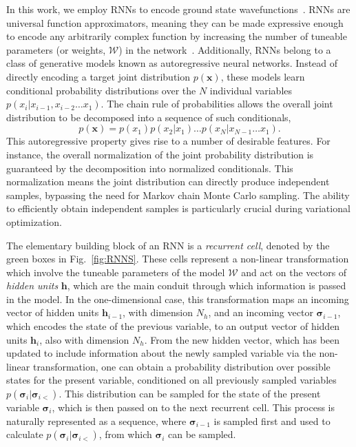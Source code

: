 \documentclass[twocolumn,
                showpacs,
                nofootinbib,
                nobibnotes,
                aps,
                superscriptaddress,
                amssymb,
                amsmath,
                floatfix,
                reprint,
                prx, 
                notitlepage,
                showkeys,
                10pt,
		]{revtex4-2}
\begin{document}
In this work, we employ RNNs to encode ground state wavefunctions~\cite{hibat2020recurrent}.
RNNs are universal function approximators, meaning they can be made expressive enough to encode any arbitrarily complex function by increasing the number of tuneable parameters (or weights, $\mathcal{W}$) in the network~\cite{schafer2006recurrent}. 
Additionally, RNNs belong to a class of generative models known as autoregressive neural networks.
Instead of directly encoding a target joint distribution $p(\mathbf{x})$, these models learn conditional probability distributions over the $N$ individual variables~$p(x_i\vert x_{i-1},x_{i-2}\dots x_{1})$. The chain rule of probabilities allows the overall joint distribution to be decomposed into a sequence of such conditionals, 
\begin{equation}
    p(\mathbf{x}) = p(x_1)p(x_2\vert x_1)\dots p(x_N\vert x_{N-1}\dots x_1).
\label{ProbChainRule}
\end{equation}
This autoregressive property gives rise to a number of desirable features. For instance, the overall normalization of the joint probability distribution is guaranteed by the decomposition into normalized conditionals. 
This normalization means the joint distribution can directly produce independent samples, bypassing the need for Markov chain Monte Carlo sampling. The ability to efficiently obtain independent samples is particularly crucial during variational optimization. 



The elementary building block of an RNN is a \emph{recurrent cell}, denoted by the green boxes in Fig.~\ref{fig:RNNS}. 
These cells represent a non-linear transformation which involve the tuneable parameters of the model $\mathcal{W}$ and act on the vectors of \emph{hidden units} $\mathbf{h}$, which are the main conduit through which information is passed in the model. In the one-dimensional case, this transformation maps an incoming vector of hidden units $\mathbf{h}_{i-1}$, with dimension $N_h$, and an incoming vector $\boldsymbol\sigma_{i-1}$, which encodes the state of the previous variable, to an output vector of hidden units $\mathbf{h}_{i}$, also with dimension $N_h$.
From the new hidden vector, which has been updated to include information about the newly sampled variable via the non-linear transformation, one can obtain a probability distribution over possible states for the present variable, conditioned on all previously sampled variables $p(\boldsymbol\sigma_i\vert \boldsymbol\sigma_{i<})$. 
This distribution can be sampled for the state of the present variable $\boldsymbol\sigma_i$, which is then passed on to the next recurrent cell. 
This process is naturally represented as a sequence, where $\boldsymbol\sigma_{i-1}$ is sampled first and used to calculate $p(\boldsymbol\sigma_i\vert \boldsymbol\sigma_{i<})$, from which $\boldsymbol\sigma_{i}$ can be sampled.   
\end{document}
